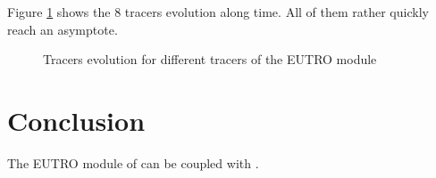 Figure \ref{fig:waq2d_eutro:res} shows the 8 tracers evolution along time.
All of them rather quickly reach an asymptote.

\begin{figure} [H]
\centering
{}
 \caption{Tracers evolution for different tracers of the EUTRO module}
 \label{fig:waq2d_eutro:res}
\end{figure}

\section{Conclusion}

The EUTRO module of \waqtel can be coupled with .
